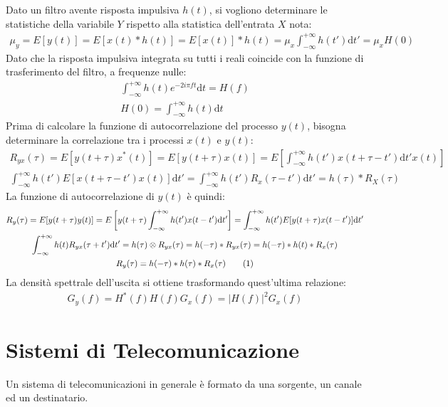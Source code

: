 \documentclass{article}
\newcommand{\df}{\mathrm{d}}
\newcommand{\tageq}{\tag{\stepcounter{equation}\theequation}}
\numberwithin{equation}{subsection}
\begin{document}
Dato un filtro avente risposta impulsiva $h(t)$, si vogliono determinare le statistiche della variabile $Y$ rispetto alla statistica dell'entrata $X$ nota:
\begin{gather*}
    \mu_y=E[y(t)]=E[x(t)*h(t)]=E[x(t)]*h(t)=\displaystyle\mu_x\int_{-\infty}^{+\infty}h(t')\df t'=\mu_xH(0)
\end{gather*}
Dato che la risposta impulsiva integrata su tutti i reali coincide con la funzione di trasferimento del filtro, a frequenze nulle:
\begin{gather*}
    \displaystyle\int_{-\infty}^{+\infty}h(t)e^{-2i\pi ft}\df t=H(f)\\
    H(0)=\displaystyle\int_{-\infty}^{+\infty}h(t)\df t
\end{gather*}
Prima di calcolare la funzione di autocorrelazione del processo $y(t)$, bisogna determinare la correlazione tra i processi $x(t)$ e $y(t)$:
\begin{gather*}
    R_{yx}(\tau)=E[y(t+\tau)x^*(t)]=E[y(t+\tau)x(t)]=E\left[\displaystyle\int_{-\infty}^{+\infty}h(t')x(t+\tau-t')\df t'x(t)\right]\\
    \displaystyle\int_{-\infty}^{+\infty}h(t')E[x(t+\tau-t')x(t)]\df t'=\displaystyle\int_{-\infty}^{+\infty}h(t')R_x(\tau-t')\df t'=h(\tau)*R_X(\tau)
\end{gather*}
La funzione di autocorrelazione di $y(t)$ è quindi:
\begin{gather*}
    R_y(\tau)=E[y(t+\tau)y(t)]=E\left[y(t+\tau)\displaystyle\int_{-\infty}^{+\infty}h(t')x(t-t')\df t'\right]=\int_{-\infty}^{+\infty}h(t')E[y(t+\tau)x(t-t')]\df t'\\
    \displaystyle\int_{-\infty}^{+\infty}h(t)R_{yx}(\tau+t')\df t'=h(\tau)\otimes R_{yx}(\tau)=h(-\tau)*R_{yx}(\tau)=h(-\tau)*h(t)*R_x(\tau)\\
    R_y(\tau)=h(-\tau)*h(\tau)*R_x(\tau)\tageq
\end{gather*}
La densità spettrale dell'uscita si ottiene trasformando quest'ultima relazione:
\begin{gather}
    G_y(f)=H^*(f)H(f)G_x(f)=|H(f)|^2G_x(f)
\end{gather}

\clearpage

\section{Sistemi di Telecomunicazione}

Un sistema di telecomunicazioni in generale è formato da una sorgente, un canale ed un destinatario. 
\end{document}
